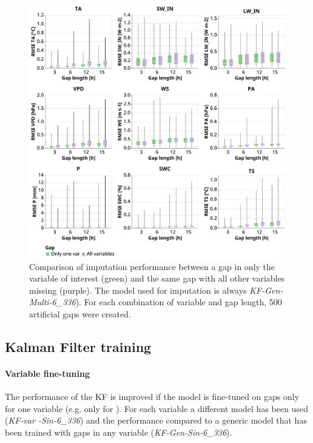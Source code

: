 \documentclass{article}
\newcommand{\imgwidth}{6in}
\let\Oldsubsection\subsection
\renewcommand{\subsection}{\FloatBarrier\Oldsubsection}
\begin{document}
\begin{figure}
\centerline{\includegraphics[width=\imgwidth]{gap_single_var}}
\caption{Comparison of imputation performance between a gap in only the variable of interest (green) and the same gap with all other variables missing (purple). The model used for imputation is always \textit{KF-Gen-Multi-6\_336}). For each combination of variable and gap length, 500 artificial gaps were created.}
\label{fig:gap_single_var}
\end{figure}

\subsection{Kalman Filter training}

\paragraph{Variable fine-tuning} The performance of the KF is improved if the model is fine-tuned on gaps only for one variable (e.g. only for ). For each variable a different model has been used (\textit{KF-\textlangle var \textrangle-Sin-6\_336}) and the performance compared to a generic model that has been trained with gaps in any variable (\textit{KF-Gen-Sin-6\_336}). 
\end{document}
